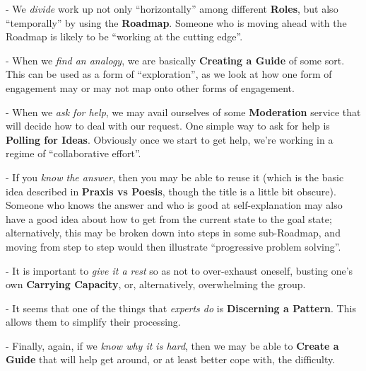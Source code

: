 - We \emph{divide} work up not only ``horizontally'' among different
\textbf{Roles}, but also ``temporally'' by using the \textbf{Roadmap}.
Someone who is moving ahead with the Roadmap is likely to be ``working
at the cutting edge''.

- When we \emph{find an analogy}, we are basically \textbf{Creating a
Guide} of some sort. This can be used as a form of ``exploration'', as
we look at how one form of engagement may or may not map onto other
forms of engagement.

- When we \emph{ask for help}, we may avail ourselves of some
\textbf{Moderation} service that will decide how to deal with our
request. One simple way to ask for help is \textbf{Polling for Ideas}.
Obviously once we start to get help, we're working in a regime of
``collaborative effort''.

- If you \emph{know the answer}, then you may be able to reuse it (which
is the basic idea described in \textbf{Praxis vs Poesis}, though the
title is a little bit obscure). Someone who knows the answer and who is
good at self-explanation may also have a good idea about how to get from
the current state to the goal state; alternatively, this may be broken
down into steps in some sub-Roadmap, and moving from step to step would
then illustrate ``progressive problem solving''.

- It is important to \emph{give it a rest} so as not to over-exhaust
oneself, busting one's own \textbf{Carrying Capacity}, or,
alternatively, overwhelming the group.

- It seems that one of the things that \emph{experts do} is
\textbf{Discerning a Pattern}. This allows them to simplify their
processing.

- Finally, again, if we \emph{know why it is hard}, then we may be able
to \textbf{Create a Guide} that will help get around, or at least better
cope with, the difficulty.
